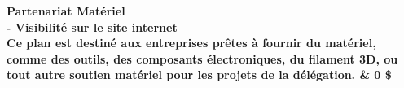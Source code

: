 \bf Partenariat Matériel\\
- Visibilité sur le site internet\\
Ce plan est destiné aux entreprises prêtes à fournir du matériel, comme des outils, des composants électroniques, du filament 3D, ou tout autre soutien matériel pour les projets de la délégation.
& 0 \$\\

